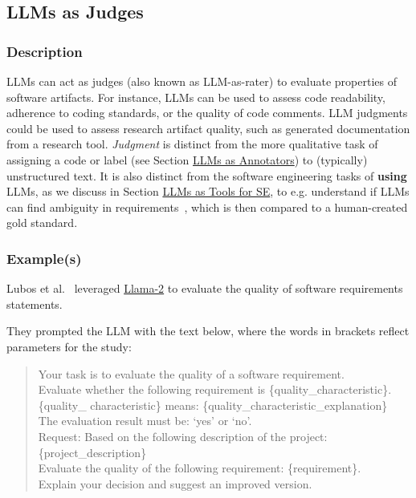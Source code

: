 \subsection{LLMs as Judges}

\subsubsection{Description}

LLMs can act as judges (also known as LLM-as-rater) to evaluate properties of software artifacts.%
For instance, LLMs can be used to assess code readability, adherence to coding standards, or the quality of code comments. LLM judgments could be used to assess research artifact quality, such as generated documentation from a research tool.
\emph{Judgment} is distinct from the more qualitative task of assigning a code or label (see Section \href{/study-types/#llms-as-annotators}{LLMs as Annotators}) to (typically) unstructured text.
It is also distinct from the software engineering tasks of \textbf{using} LLMs, as we discuss in Section \href{/study-types/#introduction-llms-as-tools-for-software-engineers}{LLMs as Tools for SE}, to e.g. understand if LLMs can find ambiguity in requirements~\cite{DBLP:conf/icse/EzziniA0S22}, which is then compared to a human-created gold standard.

\subsubsection{Example(s)}
Lubos et al.~\cite{DBLP:conf/re/LubosFTGMEL24} leveraged \href{https://www.llama.com/llama2/}{Llama-2} to evaluate the quality of software requirements statements. 

They prompted the LLM with the text below, where the words in brackets reflect parameters for the study:

\begin{quote}
Your task is to evaluate the quality of a software requirement.\\
Evaluate whether the following requirement is \{quality\_characteristic\}. \\
\{quality\_ characteristic\} means: \{quality\_characteristic\_explanation\}\\
The evaluation result must be: `yes' or `no'.\\
Request: Based on the following description of the project:
\{project\_description\}\\
Evaluate the quality of the following requirement: \{requirement\}.\\
Explain your decision and suggest an improved version.\\
\end{quote}

